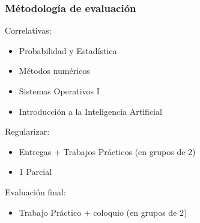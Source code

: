 \begin{frame}
	\frametitle{Métodología de evaluación}
	
	Correlativas:
	\begin{itemize}
		\item Probabilidad y Estadística
		\item Métodos numéricos 
		\item Sistemas Operativos I
		\item Introducción a la Inteligencia Artificial
	\end{itemize}
	
	Regularizar:
	\begin{itemize}
		\item Entregas + Trabajos Prácticos (en grupos de 2)
		\item 1 Parcial
	\end{itemize}

	Evaluación final:
	\begin{itemize}
		\item Trabajo Práctico + coloquio (en grupos de 2)
	\end{itemize}	
\end{frame}